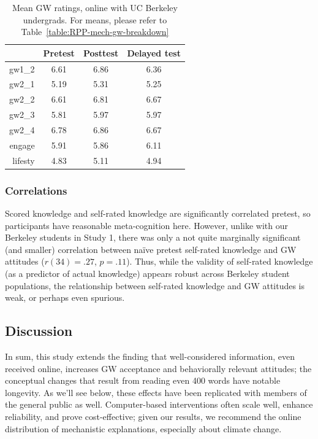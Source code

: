 \begin{table}
\caption{Mean GW ratings, online with UC Berkeley undergrads. For means, please refer to
         Table~\ref{table:RPP-mech-gw-breakdown}} 
\label{table:uc-online-gw-means}
\centering
\begin{tabular}{>{\sffamily}rccc}
  \toprule
 & Pretest & Posttest & Delayed test \\ 
  \midrule
  gw1_2 & 6.61 & 6.86 & 6.36 \\ 
  gw2_1 & 5.19 & 5.31 & 5.25 \\ 
  gw2_2 & 6.61 & 6.81 & 6.67 \\ 
  gw2_3 & 5.81 & 5.97 & 5.97 \\ 
  gw2_4 & 6.78 & 6.86 & 6.67 \\ 
  engage & 5.91 & 5.86 & 6.11 \\ 
  lifesty & 4.83 & 5.11 & 4.94 \\ 
  \bottomrule
\end{tabular}
\end{table}

\subsubsection{Correlations}

Scored knowledge and self-rated knowledge are significantly correlated pretest,
so participants have reasonable meta-cognition here. However, unlike with our
Berkeley students in Study 1, there was only a not quite marginally significant
(and smaller) correlation between na\"ive pretest self-rated knowledge and GW
attitudes ($r(34)=.27$, $p=.11$). Thus, while the validity of self-rated
knowledge (as a predictor of actual knowledge) appears robust across Berkeley
student populations, the relationship between self-rated knowledge and GW
attitudes is weak, or perhaps even spurious.

\subsection{Discussion}

In sum, this study extends the finding that well-considered information, even
received online, increases GW acceptance and behaviorally relevant attitudes;
the conceptual changes that result from reading even 400 words have notable
longevity. As we'll see below, these effects have been replicated with members
of the general public as well. Computer-based interventions often scale well,
enhance reliability, and prove cost-effective; given our results, we recommend
the online distribution of mechanistic explanations, especially about climate
change.  

